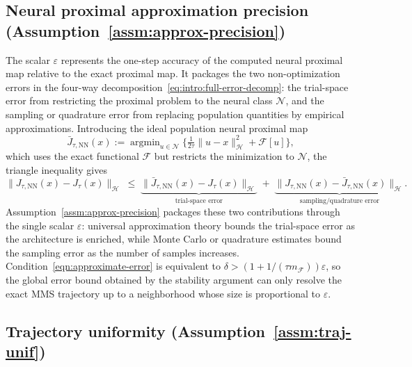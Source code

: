 \documentclass[twoside,11pt]{article}
\newcommand{\NN}{\mathrm{NN}}
\newcommand{\argmin}{\mathop{\mathrm{arg min}}}
\newcommand{\calF}{\mathcal{F}}
\newcommand{\calH}{\mathcal{H}}
\newcommand{\calN}{\mathcal{N}}
\begin{document}
\subsection{Neural proximal approximation precision (Assumption~\ref{assm:approx-precision})}\label{app:disc-approx-precision}

\begin{remark}\label{rem:approx-precision}
The scalar $\varepsilon$ represents the one-step accuracy of the computed neural proximal map relative to the exact proximal map. It packages the two non-optimization errors in the four-way decomposition~\eqref{eq:intro:full-error-decomp}: the trial-space error from restricting the proximal problem to the neural class $\calN$, and the sampling or quadrature error from replacing population quantities by empirical approximations. Introducing the ideal population neural proximal map
\[
  \bar J_{\tau,\NN}(x) := \argmin_{u\in\calN}\bigl\{\tfrac{1}{2\tau}\|u-x\|_\calH^2+\calF[u]\bigr\},
\]
which uses the exact functional $\calF$ but restricts the minimization to $\calN$, the triangle inequality gives
\[
  \|J_{\tau,\NN}(x)-J_\tau(x)\|_\calH \;\le\; \underbrace{\|\bar J_{\tau,\NN}(x)-J_\tau(x)\|_\calH}_{\text{trial-space error}} \;+\; \underbrace{\|J_{\tau,\NN}(x)-\bar J_{\tau,\NN}(x)\|_\calH}_{\text{sampling/quadrature error}}.
\]
Assumption~\ref{assm:approx-precision} packages these two contributions through the single scalar $\varepsilon$: universal approximation theory \citep{hornik1989multilayer} bounds the trial-space error as the architecture is enriched, while Monte Carlo or quadrature estimates bound the sampling error as the number of samples increases. Condition~\eqref{eqn:approximate-error} is equivalent to $\delta > (1+1/(\tau m_\calF))\varepsilon$, so the global error bound obtained by the stability argument can only resolve the exact MMS trajectory up to a neighborhood whose size is proportional to $\varepsilon$.
\end{remark}

\subsection{Trajectory uniformity (Assumption~\ref{assm:traj-unif})}\label{app:disc-traj-unif}
\end{document}
